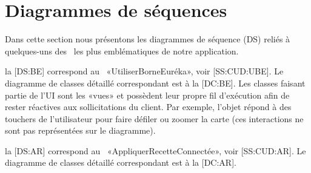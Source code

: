 \chapter{Diagrammes de séquences}

Dans cette section nous présentons les diagrammes de séquence (DS) reliés à quelques-uns des \cu\ les plus emblématiques de notre application.

\startitemize
\item la [DS:BE] correspond au \cu\ «UtiliserBorneEuréka», voir [SS:CUD:UBE].
Le diagramme de classes détaillé correspondant est à la [DC:BE].
Les classes faisant partie de l'UI sont les «vues» et possèdent leur propre fil d'exécution afin de rester réactives aux sollicitations du client.
Par exemple, l'objet  répond à des touchers de l'utilisateur pour faire défiler ou zoomer la carte (ces interactions ne sont pas représentées sur le diagramme).

\item la [DS:AR] correspond au \cu\ «AppliquerRecetteConnectée», voir [SS:CUD:AR].
Le diagramme de classes détaillé correspondant est à la [DC:AR].

\stopitemize


{}

{}

{}







